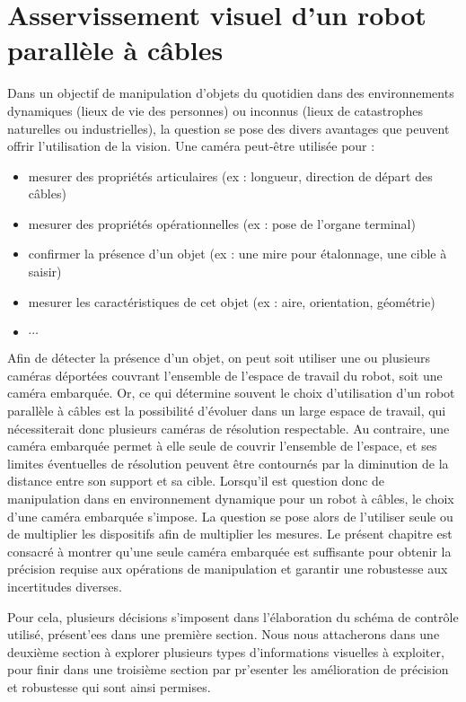 \chapter{Asservissement visuel d'un robot parall\`ele \`a c\^ables}

Dans un objectif de manipulation d'objets du quotidien dans des environnements 
dynamiques (lieux de vie des personnes) ou inconnus (lieux de catastrophes 
naturelles ou industrielles), la question se pose des divers avantages que 
peuvent offrir l'utilisation de la vision. Une cam\'era peut-\^etre utilis\'ee 
pour :
\begin{itemize}
  \item mesurer des propri\'et\'es articulaires (ex : longueur, direction de 
d\'epart des c\^ables)
  \item mesurer des propri\'et\'es op\'erationnelles (ex : pose de l'organe 
terminal)
  \item confirmer la pr\'esence d'un objet (ex : une mire pour \'etalonnage, 
une cible \`a saisir)
  \item mesurer les caract\'eristiques de cet objet (ex : aire, orientation, 
g\'eom\'etrie)
  \item $\cdots$
\end{itemize}

Afin de d\'etecter la pr\'esence d'un objet, on peut soit utiliser une ou 
plusieurs cam\'eras d\'eport\'ees couvrant l'ensemble de l'espace de travail du 
robot, soit une cam\'era embarqu\'ee. Or, ce qui d\'etermine souvent le choix 
d'utilisation d'un robot parall\`ele \`a c\^ables est la possibilit\'e 
d'\'evoluer dans un large espace de travail, qui n\'ecessiterait donc plusieurs 
cam\'eras de r\'esolution respectable. Au contraire, une cam\'era embarqu\'ee 
permet \`a elle seule de couvrir l'ensemble de l'espace, et ses limites 
\'eventuelles de r\'esolution peuvent \^etre contourn\'es par la diminution de 
la distance entre son support et sa cible. Lorsqu'il est question donc de 
manipulation dans en environnement dynamique pour un robot \`a c\^ables, le 
choix d'une cam\'era embarqu\'ee s'impose. La question se pose alors de 
l'utiliser seule ou de multiplier les dispositifs afin de multiplier les 
mesures. Le pr\'esent chapitre est consacr\'e \`a montrer qu'une seule cam\'era 
embarqu\'ee est suffisante pour obtenir la pr\'ecision requise aux op\'erations 
de manipulation et garantir une robustesse aux incertitudes diverses.

Pour cela, plusieurs d\'ecisions s'imposent dans l'\'elaboration du sch\'ema de 
contr\^ole utilis\'e, pr\'esent'ees dans une premi\`ere section. Nous nous 
attacherons dans une deuxi\`eme section \`a explorer plusieurs types 
d'informations visuelles \`a exploiter, pour finir dans une troisi\`eme section 
par pr'esenter les am\'elioration de pr\'ecision et robustesse qui sont ainsi 
permises.

